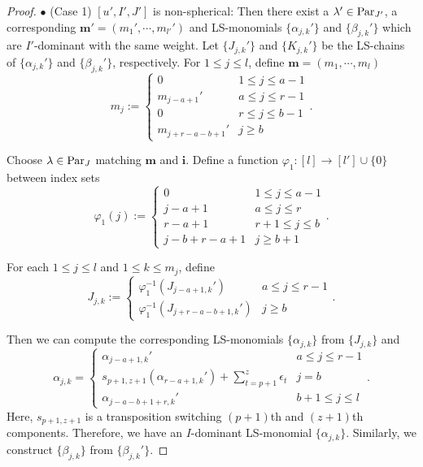 \documentclass[12pt]{amsart}
\theoremstyle{definition}
\theoremstyle{remark}
\newcommand{\Parj}{{\rm Par}_J}
\begin{document}
\begin{proof}
$\bullet$ (Case 1) $[u',I',J']$ is non-spherical: Then there exist a $\lambda' \in {\rm Par}_{J'}$, a corresponding $\mathbf{m'} = (m_1 ' , \cdots , m_{l'}')$ and LS-monomials $\{\alpha_{j,k}'\}$ and $\{\beta_{j,k}' \}$ which are $I'$-dominant with the same weight. Let $\{J_{j,k}'\}$ and $\{K_{j,k}'\}$ be the LS-chains of $\{\alpha_{j,k}'\}$ and $\{\beta_{j,k}'\}$, respectively. For $1 \leq j \leq l$, define $\mathbf{m} = (m_1 , \cdots , m_l)$
\begin{equation}\label{eqn6.15}
m_j := 
\begin{cases}
0 & 1 \leq j \leq a-1 \\
m_{j-a+1}' & a \leq j \leq r-1 \\
0 & r \leq j \leq b-1 \\
m_{j+r-a-b +1}' & j\geq b
\end{cases}
.
\end{equation}

Choose $\lambda \in \Parj$ matching $\mathbf{m}$ and $\mathbf{i}$. Define a function $\varphi_1: [l] \rightarrow [l'] \cup \{0\}$ between index sets
\begin{equation}
\varphi_1 (j):=
\begin{cases}
0 & 1 \leq j \leq a-1 \\
j-a+1 & a \leq j \leq r \\
r-a+1 & r+1 \leq j \leq b \\
j-b+r-a+1 & j \geq b+1
\end{cases}
.
\end{equation}

For each $1 \leq j \leq l$ and $1 \leq k \leq m_j$, define
\begin{equation}
J_{j,k}:=
\begin{cases}
\varphi_1^{-1}(J_{j-a+1,k}') & a \leq j \leq r-1 \\
\varphi_1^{-1}(J_{j+r-a-b+1,k}') & j \geq b
\end{cases}
.
\end{equation}

Then we can compute the corresponding LS-monomials $\{ \alpha_{j,k} \}$ from $\{J_{j,k}\}$ and
\begin{equation}\label{eqn6.18}
\alpha_{j,k} =
\begin{cases}
\alpha_{j-a+1,k}' & a \leq j \leq r-1 \\
s_{p+1,z+1}(\alpha_{r-a+1,k}') + \sum_{t=p+1}^z \epsilon_t & j = b \\
\alpha_{j-a-b+1+r,k}'  & b+1 \leq j \leq l
\end{cases}
.
\end{equation}
Here, $s_{p+1,z+1}$ is a transposition switching $(p+1)$th and $(z+1)$th components. Therefore, we have an $I$-dominant LS-monomial $\{\alpha_{j,k}\}$. Similarly, we construct $\{\beta_{j,k}\}$ from $\{\beta_{j,k}'\}$.


\end{proof}
\end{document}
